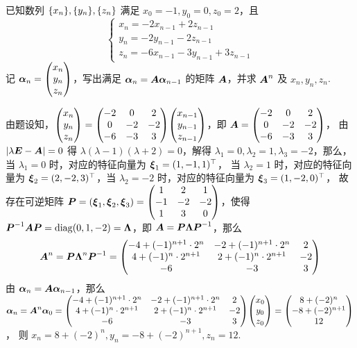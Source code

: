 \begin{example}[2024 数一]
    已知数列 $\qty{x_n},\qty{y_n},\qty{z_n}$ 满足 $x_0=-1,y_0=0,z_0=2$，且 $$\begin{cases}
            x_n=-2x_{n-1}+2z_{n-1} \\
            y_n=-2y_{n-1}-2z_{n-1} \\
            z_n=-6x_{n-1}-3y_{n-1}+3z_{n-1}
        \end{cases}$$ 记 $\vb*{\alpha}_n=\mqty(x_n\\y_n\\z_n)$，写出满足 $\vb*{\alpha}_n=\vb*{A\alpha}_{n-1}$ 的矩阵 $\vb*{A}$，并求 $\vb*{A}^n$ 及 $x_n,y_n,z_n$.
\end{example}
\begin{solution}
    由题设知，$\mqty(x_n\\y_n\\z_n)=\mqty(-2&0&2\\0&-2&-2\\-6&-3&3)\mqty(x_{n-1}\\y_{n-1}\\z_{n-1})$，即 $\vb*{A}=\mqty(-2&0&2\\0&-2&-2\\-6&-3&3)$，
    由 $|\lambda\vb*{E}-\vb*{A}|=0$ 得 $\lambda(\lambda-1)(\lambda+2)=0$，解得 $\lambda_1=0,\lambda_2=1,\lambda_3=-2$，那么，当 $\lambda_1=0$ 时，对应的特征向量为 $\vb*{\xi}_1=(1,-1,1)^\top$，
    当 $\lambda_2=1$ 时，对应的特征向量为 $\vb*{\xi}_2=(2,-2,3)^\top$，当 $\lambda_2=-2$ 时，对应的特征向量为 $\vb*{\xi}_3=(1,-2,0)^\top$，
    故存在可逆矩阵 $\vb*{P}=(\vb*{\xi}_1,\vb*{\xi}_2,\vb*{\xi}_3)=\mqty(1&2&1\\-1&-2&-2\\1&3&0)$，使得 $\vb*{P}^{-1}\vb*{AP}=\mathrm{diag}(0,1,-2)=\vb*{\Lambda}$，即 $\vb*{A}=\vb*{P\Lambda P}^{-1}$，那么 
    $$\vb*{A}^n=\vb*{P}\vb*{\Lambda}^{n}\vb*{P}^{-1}=\mqty(-4+(-1)^{n+1}\cdot 2^{n}& -2+(-1)^{n+1}\cdot 2^{n}& 2\\4+(-1)^{n}\cdot 2^{n+1}& 2+(-1)^{n}\cdot 2^{n+1}&-2\\-6&-3&3)$$
    由 $\vb*{\alpha}_n=\vb*{A\alpha}_{n-1}$，那么 $\vb*{\alpha}_n=\vb*{A}^n\vb*{\alpha}_0=\mqty(-4+(-1)^{n+1}\cdot 2^{n}& -2+(-1)^{n+1}\cdot 2^{n}& 2\\4+(-1)^{n}\cdot 2^{n+1}& 2+(-1)^{n}\cdot 2^{n+1}&-2\\-6&-3&3)\mqty(x_0\\y_0\\z_0)=\mqty(8+(-2)^{n}\\-8+(-2)^{n+1}\\12)$，
    则 $x_n=8+(-2)^{n},y_n=-8+(-2)^{n+1},z_n=12.$
\end{solution}

